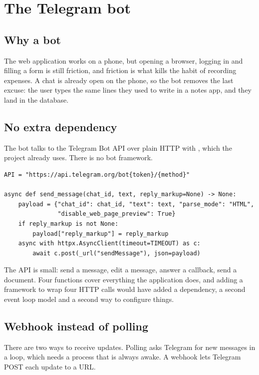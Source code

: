 \chapter{The Telegram bot}
\label{ch:bot}

\section{Why a bot}

The web application works on a phone, but opening a browser, logging in and
filling a form is still friction, and friction is what kills the habit of
recording expenses. A chat is already open on the phone, so the bot removes the
last excuse: the user types the same lines they used to write in a notes app,
and they land in the database.

\section{No extra dependency}

The bot talks to the Telegram Bot API over plain HTTP with , which
the project already uses. There is no bot framework.

\begin{lstlisting}[style=py]
API = "https://api.telegram.org/bot{token}/{method}"

async def send_message(chat_id, text, reply_markup=None) -> None:
    payload = {"chat_id": chat_id, "text": text, "parse_mode": "HTML",
               "disable_web_page_preview": True}
    if reply_markup is not None:
        payload["reply_markup"] = reply_markup
    async with httpx.AsyncClient(timeout=TIMEOUT) as c:
        await c.post(_url("sendMessage"), json=payload)
\end{lstlisting}

The API is small: send a message, edit a message, answer a callback, send a
document. Four functions cover everything the application does, and adding a
framework to wrap four HTTP calls would have added a dependency, a second event
loop model and a second way to configure things.

\section{Webhook instead of polling}

There are two ways to receive updates. Polling asks Telegram for new messages in
a loop, which needs a process that is always awake. A webhook lets Telegram POST
each update to a URL.

